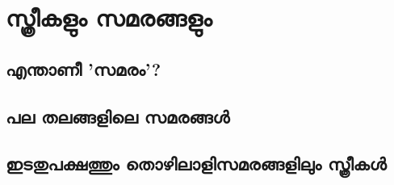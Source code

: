 \chapter{സ്ത്രീകളും സമരങ്ങളും}
\label{chapter11}
\section{എന്താണീ 'സമരം'?}
\section{പല തലങ്ങളിലെ സമരങ്ങൾ}
\section{ഇടതുപക്ഷത്തും തൊഴിലാളിസമരങ്ങളിലും സ്ത്രീകൾ}
\label{11.3}
